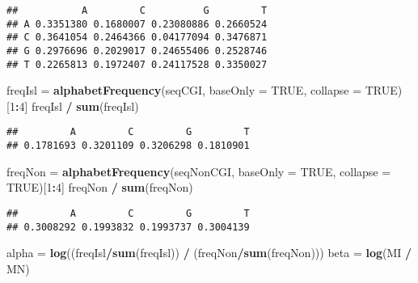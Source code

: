 \documentclass[]{article}
\newenvironment{Shaded}{\begin{snugshade}}{\end{snugshade}}
\newcommand{\KeywordTok}[1]{\textcolor[rgb]{0.13,0.29,0.53}{\textbf{#1}}}
\newcommand{\DataTypeTok}[1]{\textcolor[rgb]{0.13,0.29,0.53}{#1}}
\newcommand{\DecValTok}[1]{\textcolor[rgb]{0.00,0.00,0.81}{#1}}
\newcommand{\StringTok}[1]{\textcolor[rgb]{0.31,0.60,0.02}{#1}}
\newcommand{\OtherTok}[1]{\textcolor[rgb]{0.56,0.35,0.01}{#1}}
\newcommand{\OperatorTok}[1]{\textcolor[rgb]{0.81,0.36,0.00}{\textbf{#1}}}
\newcommand{\NormalTok}[1]{#1}
\begin{document}
\begin{verbatim}
##           A         C          G         T
## A 0.3351380 0.1680007 0.23080886 0.2660524
## C 0.3641054 0.2464366 0.04177094 0.3476871
## G 0.2976696 0.2029017 0.24655406 0.2528746
## T 0.2265813 0.1972407 0.24117528 0.3350027
\end{verbatim}

\begin{Shaded}
\begin{Highlighting}[]
\NormalTok{freqIsl =}\StringTok{ }\KeywordTok{alphabetFrequency}\NormalTok{(seqCGI, }\DataTypeTok{baseOnly =} \OtherTok{TRUE}\NormalTok{, }\DataTypeTok{collapse =} \OtherTok{TRUE}\NormalTok{)[}\DecValTok{1}\OperatorTok{:}\DecValTok{4}\NormalTok{]}
\NormalTok{freqIsl }\OperatorTok{/}\StringTok{ }\KeywordTok{sum}\NormalTok{(freqIsl)}
\end{Highlighting}
\end{Shaded}

\begin{verbatim}
##         A         C         G         T 
## 0.1781693 0.3201109 0.3206298 0.1810901
\end{verbatim}

\begin{Shaded}
\begin{Highlighting}[]
\NormalTok{freqNon =}\StringTok{ }\KeywordTok{alphabetFrequency}\NormalTok{(seqNonCGI, }\DataTypeTok{baseOnly =} \OtherTok{TRUE}\NormalTok{, }\DataTypeTok{collapse =} \OtherTok{TRUE}\NormalTok{)[}\DecValTok{1}\OperatorTok{:}\DecValTok{4}\NormalTok{]}
\NormalTok{freqNon }\OperatorTok{/}\StringTok{ }\KeywordTok{sum}\NormalTok{(freqNon)}
\end{Highlighting}
\end{Shaded}

\begin{verbatim}
##         A         C         G         T 
## 0.3008292 0.1993832 0.1993737 0.3004139
\end{verbatim}

\begin{Shaded}
\begin{Highlighting}[]
\NormalTok{alpha =}\StringTok{ }\KeywordTok{log}\NormalTok{((freqIsl}\OperatorTok{/}\KeywordTok{sum}\NormalTok{(freqIsl)) }\OperatorTok{/}\StringTok{ }\NormalTok{(freqNon}\OperatorTok{/}\KeywordTok{sum}\NormalTok{(freqNon)))}
\NormalTok{beta  =}\StringTok{ }\KeywordTok{log}\NormalTok{(MI }\OperatorTok{/}\StringTok{ }\NormalTok{MN)}
\end{Highlighting}
\end{Shaded}
\end{document}
